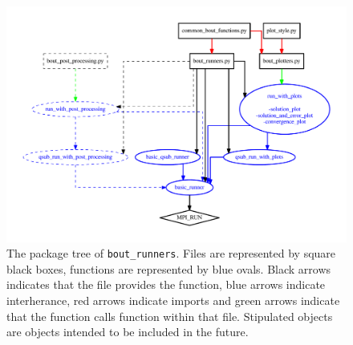 \documentclass[12pt]{article}
\begin{document}
\begin{figure}[htbp!]
\centering
\includegraphics[width=0.8\paperwidth]{figs/program_tree.pdf}
\caption{The package tree of \lstinline!bout_runners!. Files are represented by
square black boxes, functions are represented by blue ovals. Black arrows
indicates that the file provides the function, blue arrows indicate
interherance, red arrows indicate imports and green arrows indicate that the
function calls function within that file. Stipulated objects are objects
intended to be included in the future.}
\label{fig:program_tree}
\end{figure}

\printindex
\end{document}
